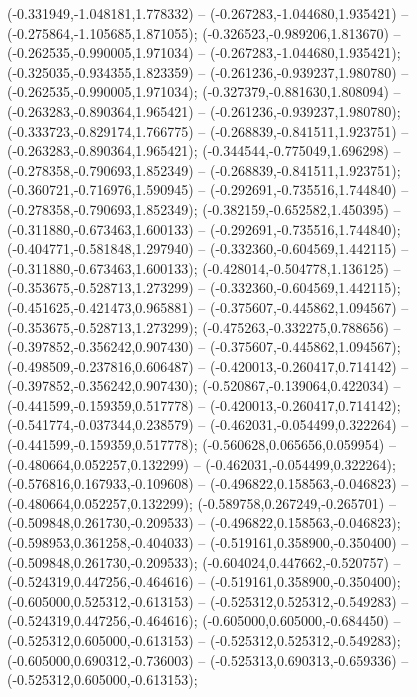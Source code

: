  (-0.331949,-1.048181,1.778332) -- (-0.267283,-1.044680,1.935421) -- (-0.275864,-1.105685,1.871055);
 (-0.326523,-0.989206,1.813670) -- (-0.262535,-0.990005,1.971034) -- (-0.267283,-1.044680,1.935421);
 (-0.325035,-0.934355,1.823359) -- (-0.261236,-0.939237,1.980780) -- (-0.262535,-0.990005,1.971034);
 (-0.327379,-0.881630,1.808094) -- (-0.263283,-0.890364,1.965421) -- (-0.261236,-0.939237,1.980780);
 (-0.333723,-0.829174,1.766775) -- (-0.268839,-0.841511,1.923751) -- (-0.263283,-0.890364,1.965421);
 (-0.344544,-0.775049,1.696298) -- (-0.278358,-0.790693,1.852349) -- (-0.268839,-0.841511,1.923751);
 (-0.360721,-0.716976,1.590945) -- (-0.292691,-0.735516,1.744840) -- (-0.278358,-0.790693,1.852349);
 (-0.382159,-0.652582,1.450395) -- (-0.311880,-0.673463,1.600133) -- (-0.292691,-0.735516,1.744840);
 (-0.404771,-0.581848,1.297940) -- (-0.332360,-0.604569,1.442115) -- (-0.311880,-0.673463,1.600133);
 (-0.428014,-0.504778,1.136125) -- (-0.353675,-0.528713,1.273299) -- (-0.332360,-0.604569,1.442115);
 (-0.451625,-0.421473,0.965881) -- (-0.375607,-0.445862,1.094567) -- (-0.353675,-0.528713,1.273299);
 (-0.475263,-0.332275,0.788656) -- (-0.397852,-0.356242,0.907430) -- (-0.375607,-0.445862,1.094567);
 (-0.498509,-0.237816,0.606487) -- (-0.420013,-0.260417,0.714142) -- (-0.397852,-0.356242,0.907430);
 (-0.520867,-0.139064,0.422034) -- (-0.441599,-0.159359,0.517778) -- (-0.420013,-0.260417,0.714142);
 (-0.541774,-0.037344,0.238579) -- (-0.462031,-0.054499,0.322264) -- (-0.441599,-0.159359,0.517778);
 (-0.560628,0.065656,0.059954) -- (-0.480664,0.052257,0.132299) -- (-0.462031,-0.054499,0.322264);
 (-0.576816,0.167933,-0.109608) -- (-0.496822,0.158563,-0.046823) -- (-0.480664,0.052257,0.132299);
 (-0.589758,0.267249,-0.265701) -- (-0.509848,0.261730,-0.209533) -- (-0.496822,0.158563,-0.046823);
 (-0.598953,0.361258,-0.404033) -- (-0.519161,0.358900,-0.350400) -- (-0.509848,0.261730,-0.209533);
 (-0.604024,0.447662,-0.520757) -- (-0.524319,0.447256,-0.464616) -- (-0.519161,0.358900,-0.350400);
 (-0.605000,0.525312,-0.613153) -- (-0.525312,0.525312,-0.549283) -- (-0.524319,0.447256,-0.464616);
 (-0.605000,0.605000,-0.684450) -- (-0.525312,0.605000,-0.613153) -- (-0.525312,0.525312,-0.549283);
 (-0.605000,0.690312,-0.736003) -- (-0.525313,0.690313,-0.659336) -- (-0.525312,0.605000,-0.613153);
